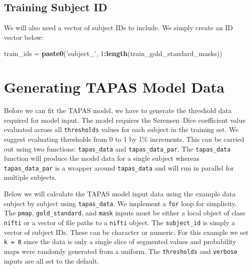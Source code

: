 \documentclass[]{article}
\newenvironment{Shaded}{\begin{snugshade}}{\end{snugshade}}
\newcommand{\DecValTok}[1]{\textcolor[rgb]{0.00,0.00,0.81}{#1}}
\newcommand{\KeywordTok}[1]{\textcolor[rgb]{0.13,0.29,0.53}{\textbf{#1}}}
\newcommand{\NormalTok}[1]{#1}
\newcommand{\OperatorTok}[1]{\textcolor[rgb]{0.81,0.36,0.00}{\textbf{#1}}}
\newcommand{\StringTok}[1]{\textcolor[rgb]{0.31,0.60,0.02}{#1}}
\begin{document}
\hypertarget{training-subject-id}{%
\subsection{Training Subject ID}\label{training-subject-id}}

We will also need a vector of subject IDs to include. We simply create
an ID vector below:

\begin{Shaded}
\begin{Highlighting}[]
\NormalTok{train_ids =}\StringTok{ }\KeywordTok{paste0}\NormalTok{(}\StringTok{'subject_'}\NormalTok{, }\DecValTok{1}\OperatorTok{:}\KeywordTok{length}\NormalTok{(train_gold_standard_masks))}
\end{Highlighting}
\end{Shaded}

\hypertarget{generating-tapas-model-data}{%
\section{Generating TAPAS Model
Data}\label{generating-tapas-model-data}}

Before we can fit the TAPAS model, we have to generate the threshold
data required for model input. The model requires the Sørensen--Dice
coefficient value evaluated across all \texttt{thresholds} values for
each subject in the training set. We suggest evaluating thresholds from
0 to 1 by 1\% increments. This can be carried out using two functions:
\texttt{tapas\_data} and \texttt{tapas\_data\_par}. The
\texttt{tapas\_data} function will produce the model data for a single
subject whereas \texttt{tapas\_data\_par} is a wrapper around
\texttt{tapas\_data} and will run in parallel for multiple subjects.

Below we will calculate the TAPAS model input data using the example
data subject by subject using \texttt{tapas\_data}. We implement a
\texttt{for} loop for simplicity. The \texttt{pmap},
\texttt{gold\_standard}, and \texttt{mask} inputs must be either a local
object of class \texttt{nifti} or a vector of file paths to a
\texttt{nifti} object. The \texttt{subject\_id} is simply a vector of
subject IDs. These can be character or numeric. For this example we set
\texttt{k\ =\ 0} since the data is only a single slice of segmented
values and probability maps were randomly generated from a uniform. The
\texttt{thresholds} and \texttt{verbose} inputs are all set to the
default.
\end{document}
